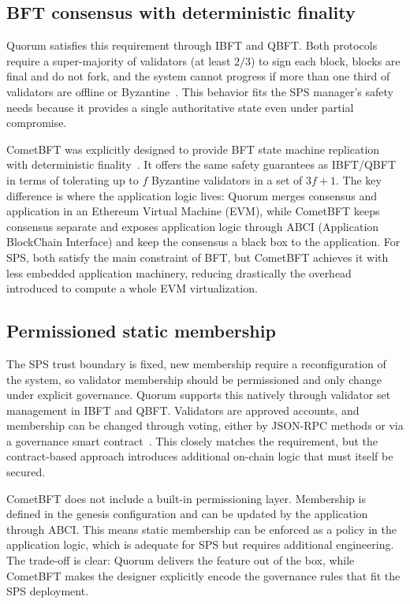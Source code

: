 \subsection{BFT consensus with deterministic finality}
Quorum satisfies this requirement through IBFT and QBFT. Both protocols require a super-majority of validators (at least $2/3$) to sign each block, blocks are final and do not fork, and the system cannot progress if more than one third of validators are offline or Byzantine~\cite{QBFTCons90:online, moniz2020istanbul}. This behavior fits the SPS manager's safety needs because it provides a single authoritative state even under partial compromise.

CometBFT was explicitly designed to provide BFT state machine replication with deterministic finality~\cite{buchman2018latest, cometbft}. It offers the same safety guarantees as IBFT/QBFT in terms of tolerating up to $f$ Byzantine validators in a set of $3f+1$. The key difference is where the application logic lives: Quorum merges consensus and application in an Ethereum Virtual Machine (EVM), while CometBFT keeps consensus separate and exposes application logic through ABCI (Application BlockChain Interface) and keep the consensus a black box to the application. For SPS, both satisfy the main constraint of BFT, but CometBFT achieves it with less embedded application machinery, reducing drastically the overhead introduced to compute a whole EVM virtualization.

\subsection{Permissioned static membership}
The SPS trust boundary is fixed, new membership require a reconfiguration of the system, so validator membership should be permissioned and only change under explicit governance. Quorum supports this natively through validator set management in IBFT and QBFT. Validators are approved accounts, and membership can be changed through voting, either by JSON-RPC methods or via a governance smart contract~\cite{QBFTCons90:online}. This closely matches the requirement, but the contract-based approach introduces additional on-chain logic that must itself be secured.

CometBFT does not include a built-in permissioning layer. Membership is defined in the genesis configuration and can be updated by the application through ABCI. This means static membership can be enforced as a policy in the application logic, which is adequate for SPS but requires additional engineering. The trade-off is clear: Quorum delivers the feature out of the box, while CometBFT makes the designer explicitly encode the governance rules that fit the SPS deployment.

